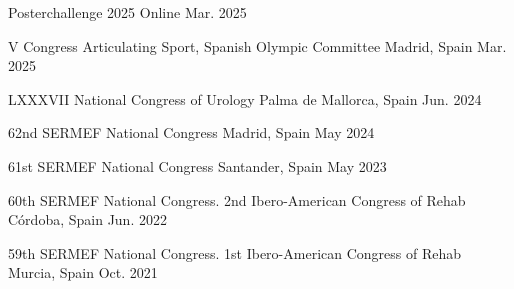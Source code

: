 

\begin{cvhonors}
  \cvhonor
    {Posterchallenge 2025} %
    {Online} %
    {}
    {Mar. 2025} %

  \cvhonor
    {V Congress Articulating Sport, Spanish Olympic Committee} %
    {Madrid, Spain} %
    {}
    {Mar. 2025} %

  \cvhonor
    {LXXXVII National Congress of Urology} %
    {Palma de Mallorca, Spain} %
    {}
    {Jun. 2024} %

  \cvhonor
    {62nd SERMEF National Congress} %
    {Madrid, Spain} %
    {}
    {May 2024} %

  \cvhonor
    {61st SERMEF National Congress} %
    {Santander, Spain} %
    {}
    {May 2023} %

  \cvhonor
    {60th SERMEF National Congress. 2nd Ibero-American Congress of Rehab} %
    {Córdoba, Spain} %
    {}
    {Jun. 2022} %

  \cvhonor
    {59th SERMEF National Congress. 1st Ibero-American Congress of Rehab} %
    {Murcia, Spain} %
    {}
    {Oct. 2021} %
\end{cvhonors}

